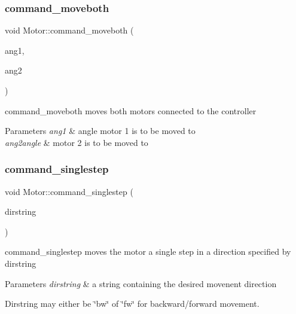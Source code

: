 \subsubsection{\texorpdfstring{command\+\_\+moveboth}{command\_moveboth}}
{\footnotesize\ttfamily void Motor\+::command\+\_\+moveboth (\begin{DoxyParamCaption}\item[{double}]{ang1,  }\item[{double}]{ang2 }\end{DoxyParamCaption})\hspace{0.3cm}{\ttfamily [slot]}}



command\+\_\+moveboth moves both motors connected to the controller 


\begin{DoxyParams}{Parameters}
{\em ang1} & angle motor 1 is to be moved to \\
\hline
{\em ang2angle} & motor 2 is to be moved to \\
\hline
\end{DoxyParams}
\mbox{\label{classMotor_ae052b079f5bd433c3561eb8b6d772b80}} 
\subsubsection{\texorpdfstring{command\+\_\+singlestep}{command\_singlestep}}
{\footnotesize\ttfamily void Motor\+::command\+\_\+singlestep (\begin{DoxyParamCaption}\item[{Q\+String}]{dirstring }\end{DoxyParamCaption})\hspace{0.3cm}{\ttfamily [slot]}}



command\+\_\+singlestep moves the motor a single step in a direction specified by dirstring 


\begin{DoxyParams}{Parameters}
{\em dirstring} & a string containing the desired movenent direction\\
\hline
\end{DoxyParams}
Dirstring may either be \char`\"{}bw\char`\"{} of \char`\"{}fw\char`\"{} for backward/forward movement. \mbox{\label{classMotor_aafbe8e02e29d2a81287747ae09b3d9fa}} 
